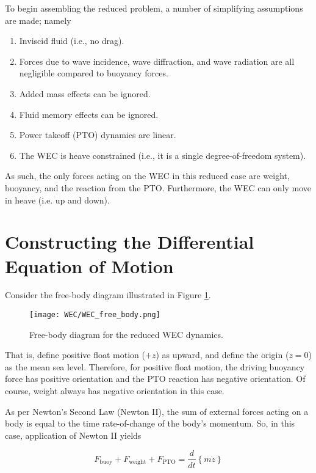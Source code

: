 To begin assembling the reduced problem, a number of simplifying assumptions are made; namely

\begin{enumerate}
	\item Inviscid fluid (i.e., no drag).
	\item Forces due to wave incidence, wave diffraction, and wave radiation are all negligible compared to buoyancy forces.
	\item Added mass effects can be ignored.
	\item Fluid memory effects can be ignored.
	\item Power takeoff (PTO) dynamics are linear.
	\item The WEC is heave constrained (i.e., it is a single degree-of-freedom system).
\end{enumerate}

\noindent As such, the only forces acting on the WEC in this reduced case are weight, buoyancy, and the reaction from the PTO. Furthermore, the WEC can only move in heave (i.e. up and down).

\section{Constructing the Differential Equation of Motion}

Consider the free-body diagram illustrated in Figure \ref{fig:WEC_free_body}.

\begin{figure}[H]
    \centering
    \texttt{[image: WEC/WEC\_free\_body.png]}
    \caption{Free-body diagram for the reduced WEC dynamics.}
    \label{fig:WEC_free_body}
\end{figure}

\noindent That is, define positive float motion ($+z$) as upward, and define the origin ($z=0$) as the mean sea level. Therefore, for positive float motion, the driving buoyancy force has positive orientation and the PTO reaction has negative orientation. Of course, weight always has negative orientation in this case.\par 
As per Newton's Second Law (Newton II), the sum of external forces acting on a body is equal to the time rate-of-change of the body's momentum. So, in this case, application of Newton II yields

\begin{equation}
	F_\textrm{buoy} + F_\textrm{weight} + F_\textrm{PTO} = \frac{d}{dt}\left\{m\dot{z}\right\}
	\label{eqn:Newton_II}
\end{equation}

